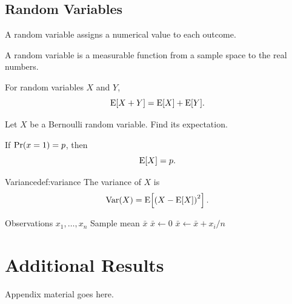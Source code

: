 \documentclass[11pt,a4paper]{book}
\begin{document}
\section{Random Variables}

A random variable assigns a numerical value to each outcome.

\begin{definition}
A random variable is a measurable function from a sample space
to the real numbers.
\end{definition}

\begin{theorem}
For random variables \(X\) and \(Y\),
\[
  \mathrm{E}[X+Y]
  =
  \mathrm{E}[X]+\mathrm{E}[Y].
\]
\end{theorem}

\begin{question}[Expectation]
Let \(X\) be a Bernoulli random variable. Find its expectation.
\end{question}

\begin{kaitou}
If $\mathrm{Pr}\paren{x=1} = p$, then
\[
  \mathrm{E}[X]=p.
\]
\end{kaitou}

\begin{defbox}{Variance}{def:variance}
The variance of \(X\) is
\[
  \operatorname{Var}(X)
  =
  \mathrm{E}\!\left[
    \left(X-\mathrm{E}[X]\right)^2
  \right].
\]
\end{defbox}

\begin{algorithm}
  \caption{Calculate the sample mean}
  \begin{algorithmic}
    \AlgInput Observations \(x_1,\dots,x_n\)
    \AlgOutput Sample mean \(\bar{x}\)
    \State \(\bar{x}\gets 0\)
      \State \(\bar{x}\gets\bar{x}+x_i/n\)
    \EndFor
  \end{algorithmic}
\end{algorithm}


\appendix
\chapter{Additional Results}

Appendix material goes here.
\end{document}
